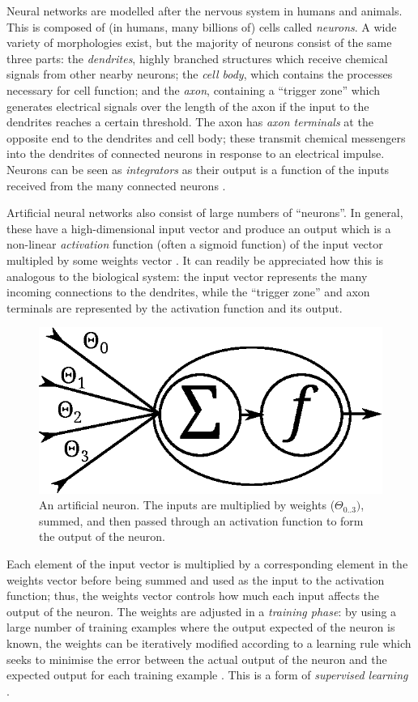 Neural networks are modelled after the nervous system in humans and animals.  This is composed of (in humans, many billions of) cells called \emph{neurons}.  A wide variety of morphologies exist, but the majority of neurons consist of the same three parts: the \emph{dendrites}, highly branched structures which receive chemical signals from other nearby neurons; the \emph{cell body}, which contains the processes necessary for cell function; and the \emph{axon}, containing a ``trigger zone'' which generates electrical signals over the length of the axon if the input to the dendrites reaches a certain threshold.  The axon has \emph{axon terminals} at the opposite end to the dendrites and cell body; these transmit chemical messengers into the dendrites of connected neurons in response to an electrical impulse.  Neurons can be seen as \emph{integrators} as their output is a function of the inputs received from the many connected neurons \cite[p. 152]{Vander}.

Artificial neural networks also consist of large numbers of ``neurons''.  In general, these have a high-dimensional input vector and produce an output which is a non-linear \emph{activation} function (often a sigmoid function) of the input vector multipled by some weights vector \cite[p. 1]{Annema1995}.  It can readily be appreciated how this is analogous to the biological system: the input vector represents the many incoming connections to the dendrites, while the ``trigger zone'' and axon terminals are represented by the activation function and its output.

\begin{figure}[ht]
\centering
\includegraphics[width=0.5\linewidth]{diagrams/neuron}
\caption[An artificial neuron]{An artificial neuron.  The inputs are multiplied by weights ($\Theta_{0..3})$, summed, and then passed through an activation function to form the output of the neuron.}
\label{fig:neuron}
\end{figure}

Each element of the input vector is multiplied by a corresponding element in the weights vector before being summed and used as the input to the activation function; thus, the weights vector controls how much each input affects the output of the neuron.  The weights are adjusted in a \emph{training phase}: by using a large number of training examples where the output expected of the neuron is known, the weights can be iteratively modified according to a learning rule which seeks to minimise the error between the actual output of the neuron and the expected output for each training example \cite[p. 1]{Annema1995}.  This is a form of \emph{supervised learning} \cite[p. 695]{RussellNorvig}.

